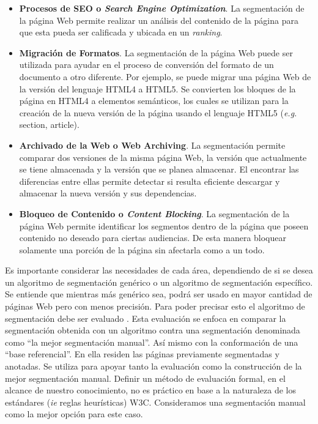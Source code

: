 \documentclass[10pt]{revecom}
\begin{document}
\begin{itemize}
\item \textbf{Procesos de SEO o \textit{Search Engine Optimization}}. La segmentación de la página Web permite realizar un análisis del contenido de la página para que esta pueda ser calificada y ubicada en un \emph{ranking}.
%
\item \textbf{Migración de Formatos}. La segmentación de la página Web puede ser utilizada para ayudar en el proceso de conversión del formato de un documento a otro diferente. Por ejemplo, se puede migrar una página Web de la versión del lenguaje HTML4 a HTML5. Se convierten los bloques de la página en HTML4 a elementos semánticos, los cuales se utilizan para la creación de la nueva versión de la página usando el lenguaje HTML5 (\emph{e.g.} section, article). 
%
\item \textbf{Archivado de la Web o Web Archiving}. La segmentación permite comparar dos versiones de la misma página Web, la versión que actualmente se tiene almacenada y la versión que se planea almacenar. El encontrar las diferencias entre ellas permite detectar si resulta eficiente descargar y almacenar la nueva versión y sus dependencias. 
%
\item \textbf{Bloqueo de Contenido o \textit{Content Blocking}}. La segmentación de la página Web permite  identificar los segmentos dentro de la página que poseen contenido no deseado para ciertas audiencias. De esta manera bloquear solamente una porción de la página sin afectarla como a un todo.
\end{itemize}
%
Es importante considerar las necesidades de cada área, dependiendo de si se desea un algoritmo de segmentación genérico o un algoritmo de segmentación específico. 
Se entiende que mientras más genérico sea, podrá ser usado en mayor cantidad de páginas Web pero con menos precisión. 
%
Para poder precisar esto el algoritmo de segmentación debe ser evaluado \cite{SanGan:SAC:2015}. 
%
Esta evaluación se enfoca en comparar la segmentación obtenida con un algoritmo contra una segmentación denominada como ``la mejor segmentación manual''.
Así mismo con la conformación de una ``base referencial''. En ella residen las páginas previamente segmentadas y anotadas. Se utiliza para apoyar tanto la evaluación como la construcción de la mejor segmentación manual.
%
Definir un método de evaluación formal, en el alcance de nuestro conocimiento, no es práctico en base a la naturaleza de los estándares (\emph{ie} reglas heurísticas) W3C.
%
Consideramos una segmentación manual como la mejor opción para este caso.
\end{document}
